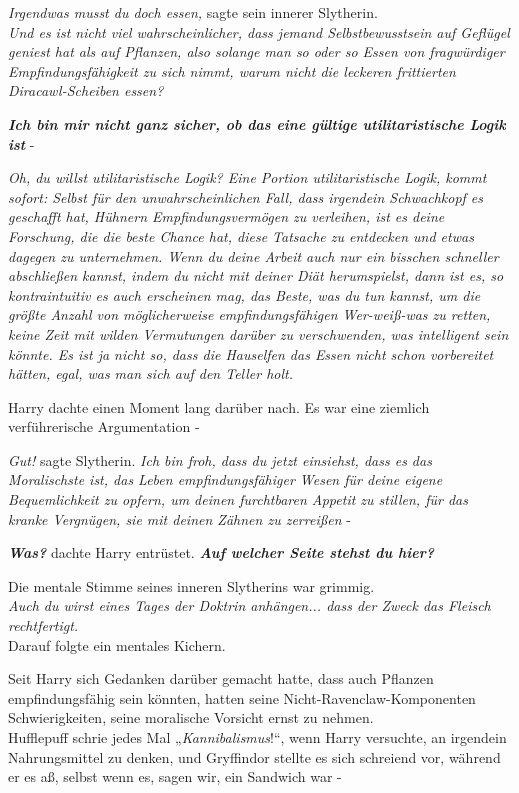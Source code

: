 {\emph{Irgendwas musst du doch essen,} sagte sein innerer Slytherin.\\ \emph{Und es ist nicht viel wahrscheinlicher, dass jemand Selbstbewusstsein auf Geflügel geniest hat als auf Pflanzen, also solange man so oder so Essen von fragwürdiger Empfindungsfähigkeit zu sich nimmt, warum nicht die leckeren frittierten Diracawl-Scheiben essen?}

\textbf{\emph{Ich bin mir nicht ganz sicher, ob das eine gültige utilitaristische Logik ist}} -

\emph{Oh, du willst utilitaristische Logik? Eine Portion utilitaristische Logik, kommt sofort: Selbst für den unwahrscheinlichen Fall, dass irgendein Schwachkopf es geschafft hat, Hühnern Empfindungsvermögen zu verleihen, ist es deine Forschung, die die beste Chance hat, diese Tatsache zu entdecken und etwas dagegen zu unternehmen. Wenn du deine Arbeit auch nur ein bisschen schneller abschließen kannst, indem du nicht mit deiner Diät herumspielst, dann ist es, so kontraintuitiv es auch erscheinen mag, das Beste, was du tun kannst, um die größte Anzahl von möglicherweise empfindungsfähigen Wer-weiß-was zu retten, keine Zeit mit wilden Vermutungen darüber zu verschwenden, was intelligent sein könnte. Es ist ja nicht so, dass die Hauselfen das Essen nicht schon vorbereitet hätten, egal, was man sich auf den Teller holt.}

Harry dachte einen Moment lang darüber nach. Es war eine ziemlich verführerische Argumentation -

\emph{Gut!} sagte Slytherin. \emph{Ich bin froh, dass du jetzt einsiehst, dass es das Moralischste ist, das Leben empfindungsfähiger Wesen für deine eigene Bequemlichkeit zu opfern, um deinen furchtbaren Appetit zu stillen, für das kranke Vergnügen, sie mit deinen Zähnen zu zerreißen} -

\textbf{\emph{Was?}} dachte Harry entrüstet. \textbf{\emph{Auf welcher Seite stehst du hier?}}

Die mentale Stimme seines inneren Slytherins war grimmig.\\ \emph{Auch du wirst eines Tages der Doktrin anhängen... dass der Zweck das Fleisch rechtfertigt.}\\ Darauf folgte ein mentales Kichern.

Seit Harry sich Gedanken darüber gemacht hatte, dass auch Pflanzen empfindungsfähig sein könnten, hatten seine Nicht-Ravenclaw-Komponenten Schwierigkeiten, seine moralische Vorsicht ernst zu nehmen.\\ Hufflepuff schrie jedes Mal „\emph{Kannibalismus}!“, wenn Harry versuchte, an irgendein Nahrungsmittel zu denken, und Gryffindor stellte es sich schreiend vor, während er es aß, selbst wenn es, sagen wir, ein Sandwich war -

}
